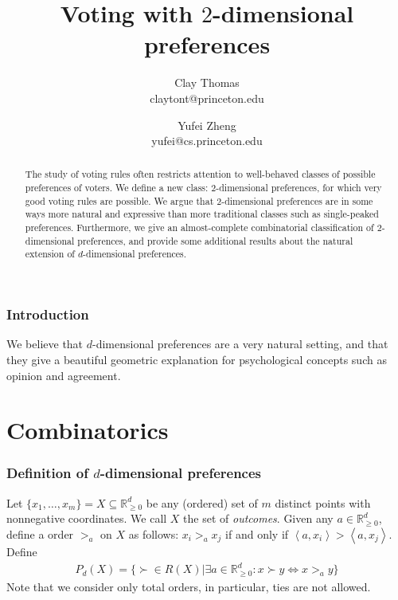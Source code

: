 \documentclass[12pt]{article}
\newcommand{\Rgz}{\mathbb{R}_{\ge 0}}
\newcommand{\ip}[2]{\left\langle{#1},{#2}\right\rangle}
\newcommand{\1}[1]{\mathds{1}[{#1}]}
\begin{document}
 
\title{Voting with $2$-dimensional preferences}
\author{
  Clay Thomas \\
  claytont@princeton.edu
\and
  Yufei Zheng\\
  yufei@cs.princeton.edu
}

\maketitle
\begin{abstract}
  The study of voting rules often restricts attention to
  well-behaved classes of possible preferences of voters.
  We define a new class: $2$-dimensional preferences,
  for which very good voting rules are possible.
  We argue that $2$-dimensional preferences are in some ways
  more natural and expressive than more traditional classes
  such as single-peaked preferences.
  Furthermore, we give an almost-complete combinatorial classification
  of $2$-dimensional preferences, and provide some additional
  results about the natural extension of $d$-dimensional preferences.
\end{abstract}

\section{Introduction}

  We believe that $d$-dimensional preferences are a very natural setting,
  and that they give a beautiful geometric explanation for psychological
  concepts such as opinion and agreement. 



\clearpage
\part{Combinatorics}

\section{Definition of $d$-dimensional preferences}
  Let $\{x_1,\ldots,x_m\} = X\subseteq \Rgz^d$ be any (ordered) set of
  $m$ distinct points with nonnegative coordinates.
  We call $X$ the set of \emph{outcomes}.
  Given any $a\in \Rgz^d$, define a order $>_a$ on $X$ as follows:
  $x_i >_a x_j$ if and only if $\ip{a}{x_i} > \ip{a}{x_j}$.
  Define
  \begin{align*}
    P_d(X) = \{ \succ \in R(X) | \exists a\in\Rgz^d: x \succ y \iff x >_a y\}
  \end{align*}
  Note that we consider only total orders, in particular,
  ties are not allowed.
\end{document}
